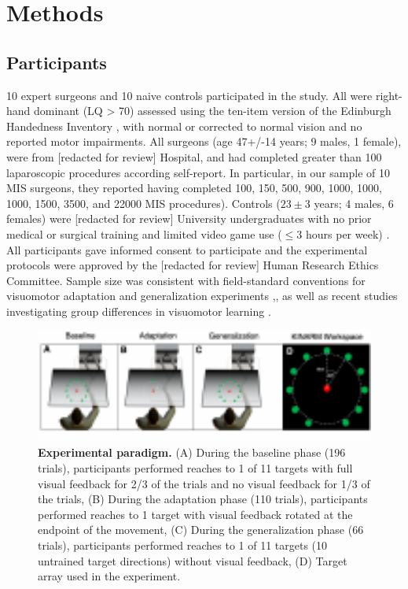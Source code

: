 \documentclass[jou, 11pt, longtable, floatsintext, notab]{apa6}
\begin{document}
\section{Methods}
\subsection{Participants}
10 expert surgeons and 10 naive controls participated in the
study. All were right-hand dominant (LQ > 70) assessed using
the ten-item version of the Edinburgh Handedness Inventory
\cite{oldfield_assessment_1971}, with normal or corrected to
normal vision and no reported motor impairments. All
surgeons (age 47+/-14 years; 9 males, 1 female), were from
[redacted for review] Hospital, and had completed greater
than 100 laparoscopic procedures according self-report. In
particular, in our sample of 10 MIS surgeons, they reported
having completed 100, 150, 500, 900, 1000, 1000, 1000, 1500,
3500, and 22000 MIS procedures). Controls ($23\pm3$ years; 4
males, 6 females) were [redacted for review] University
undergraduates with no prior medical or surgical training
and limited video game use ($\leq 3$ hours per week)
\cite{gozli_effect_2014}\cite{lynch_video_2010}\cite{li_playing_2016}.
All participants gave informed consent to participate and
the experimental protocols were approved by the [redacted
for review] Human Research Ethics Committee. Sample size was
consistent with field-standard conventions for visuomotor
adaptation and generalization experiments
\cite{krakauer_learning_2000},\cite{krakauer_independent_1999},\cite{brayanov_motor_2012}
as well as recent studies investigating group differences in
visuomotor learning \cite{leukel_experts_2015}.
\begin{figure}[h!]
  \centering
  \includegraphics[width=1.0\textwidth]{figures/fig_1.pdf}
  \caption{\scriptsize
    \textbf{Experimental paradigm.} (A) During the baseline
    phase (196 trials), participants performed reaches to 1 of
    11 targets with full visual feedback for 2/3 of the trials
    and no visual feedback for 1/3 of the trials, (B) During the
    adaptation phase (110 trials), participants performed
    reaches to 1 target with visual feedback rotated at the
    endpoint of the movement, (C) During the generalization
    phase (66 trials), participants performed reaches to 1 of 11
    targets (10 untrained target directions) without visual
    feedback, (D) Target array used in the experiment.
  }
  \label{fig_paradigm}
\end{figure}
\end{document}
